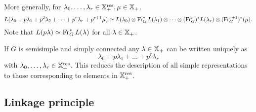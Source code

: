 More generally, for $\lambda_0,\dots,\lambda_r\in \mathbb{X}_+^{\mathrm{res}},\mu\in \mathbb{X}_+$.
\[
L(\lambda_0+p\lambda_1+p^2\lambda_2+\dots+p^{r}\lambda_r + p^{r+1}\mu) \simeq L(\lambda_0)\otimes \operatorname{Fr}_G^{*}L(\lambda_1) \otimes\dots\otimes (\operatorname{Fr}_G^{r})^{*}L(\lambda_r)\otimes(\operatorname{Fr}_G^{r+1})^{*}(\mu).
\] 
Note that $L(p\lambda)\simeq \operatorname{Fr}_G^{*}L(\lambda)$ for all $\lambda\in \mathbb{X}_+$.

\begin{remark}
	If $G$ is semisimple and simply connected any $\lambda\in \mathbb{X}_+$ can be written uniquely as
	\[
		\lambda_0+p\lambda_1+\dots+p^{r}\lambda_r
	\] 
	with $\lambda_0,\dots,\lambda_r\in \mathbb{X}_+^{\mathrm{res}}$. This reduces the description of all simple representations to those corresponding to elements in $\mathbb{X}_+^{\mathrm{res}}$.
\end{remark}
\subsection{Linkage principle}
